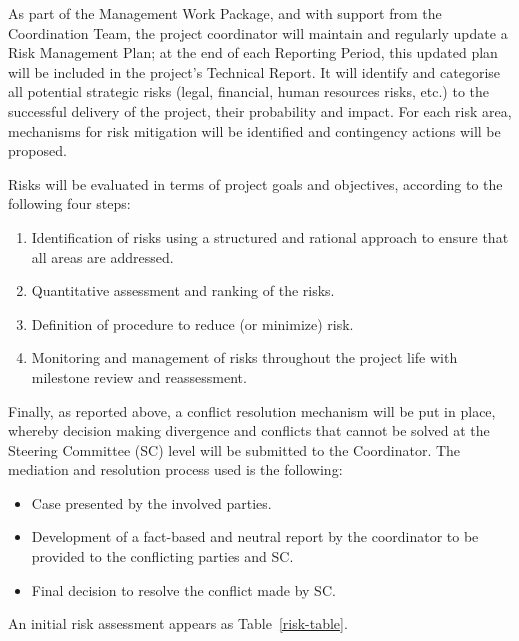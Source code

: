 As part of the Management Work Package, and with support from the
Coordination Team, the project coordinator will maintain and regularly
update a Risk Management Plan; at the end of each Reporting Period,
this updated plan will be included in the project's Technical Report.
It will identify and categorise all
potential strategic risks (legal, financial, human resources risks, etc.)
to the successful delivery of the project, their probability and impact.
For each risk area, mechanisms for risk mitigation will be identified
and contingency actions will be proposed.

Risks will be evaluated in terms of project goals and objectives,
according to the following four steps:
\begin{enumerate}
\item Identification of risks using a structured and rational approach to
ensure that all areas are addressed.
\item Quantitative assessment and ranking of the risks.
\item Definition of procedure to reduce (or minimize) risk.
\item Monitoring and management of risks throughout the project life
with milestone review and reassessment.
\end{enumerate}

Finally, as reported above, a conflict resolution mechanism will be put in place,
whereby decision making divergence and conflicts that cannot be solved
at the Steering Committee (SC) level will be submitted to the Coordinator. The
mediation and resolution process used is the following:
\begin{itemize}
\item Case presented by the involved parties.
\item Development of a fact-based and neutral report by the coordinator
to be provided to the conflicting parties and SC.
\item Final decision to resolve the conflict made by SC.
\end{itemize}

\ifgrantagreement\else
An initial risk assessment appears as Table~\ref{risk-table}.


